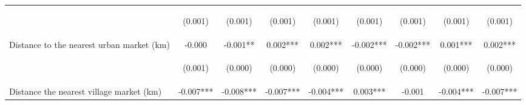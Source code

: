 \begin{center}
\begin{tabular}{lcccccccc}
\vspace{4pt} & \begin{footnotesize}(0.001)\end{footnotesize} & \begin{footnotesize}(0.001)\end{footnotesize} & \begin{footnotesize}(0.001)\end{footnotesize} & \begin{footnotesize}(0.001)\end{footnotesize} & \begin{footnotesize}(0.001)\end{footnotesize} & \begin{footnotesize}(0.001)\end{footnotesize} & \begin{footnotesize}(0.001)\end{footnotesize} & \begin{footnotesize}(0.001)\end{footnotesize} \\
Distance to the nearest urban market (km) & -0.000 & -0.001** & 0.002*** & 0.002*** & -0.002*** & -0.002*** & 0.001*** & 0.002*** \\
\vspace{4pt} & \begin{footnotesize}(0.001)\end{footnotesize} & \begin{footnotesize}(0.000)\end{footnotesize} & \begin{footnotesize}(0.000)\end{footnotesize} & \begin{footnotesize}(0.000)\end{footnotesize} & \begin{footnotesize}(0.000)\end{footnotesize} & \begin{footnotesize}(0.000)\end{footnotesize} & \begin{footnotesize}(0.000)\end{footnotesize} & \begin{footnotesize}(0.000)\end{footnotesize} \\
Distance the nearest village market (km) & -0.007*** & -0.008*** & -0.007*** & -0.004*** & 0.003*** & -0.001 & -0.004*** & -0.007*** \\

\end{tabular}
\end{center}
